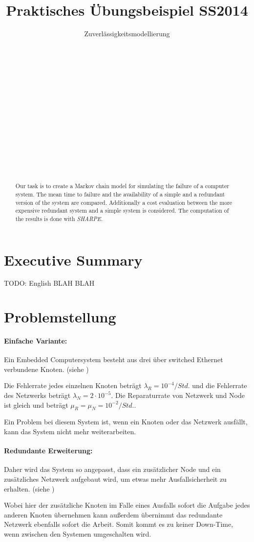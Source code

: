 \documentclass[
            a4paper
            ]{scrartcl}%
\title{Praktisches Übungsbeispiel SS2014}
\subtitle{Zuverlässigkeitsmodellierung}
\author{
 \authorname{Markus Kessler} \\
 \studentnumber{1225380} \\
 \curriculum{033 535}\\
 \email{e1225380@student.tuwien.ac.at}\\\\
 \authorname{Mathias Lechner} \\
 \studentnumber{1225134} \\
 \curriculum{033 535}\\
 \email{e1225134@student.tuwien.ac.at}\\\\
 \authorname{Martin Wührer} \\
 \studentnumber{1225177} \\
 \curriculum{033 535}\\
 \email{e1225177@student.tuwien.ac.at}
}
\begin{document}
\renewcommand*{\Frefeqname}{Gleichung}
\renewcommand*{\Freffigname}{Abbildung}
\renewcommand*{\Frefsecname}{Abschnitt}

\maketitle
\newpage

\tableofcontents
\newpage
\begin{abstract}
Our task is to create a Markov chain model for simulating the failure of a
computer system. The mean time to failure and the availability of a simple and a
redundant version of the system are compared. Additionally a cost evaluation
between the more expensive redundant system and a simple system is considered.
The computation of the results is done with \emph{SHARPE}.
\end{abstract}

\section{Executive Summary}
TODO: English BLAH BLAH
\newpage

\section{Problemstellung}
\paragraph{Einfache Variante:}
Ein Embedded Computersystem besteht aus drei über switched Ethernet verbundene
Knoten. (siehe )

Die Fehlerrate jedes einzelnen Knoten beträgt $\lambda_R=10^{-4}/Std.$ und die Fehlerrate
des Netzwerks beträgt $\lambda_N=2\cdot 10^{-5}$.
Die Reparaturrate von Netzwerk und Node ist gleich und beträgt
$\mu_R=\mu_N=10^{-2}/Std.$.

Ein Problem bei diesem System ist, wenn ein Knoten oder das Netzwerk ausfällt, kann das System nicht mehr
weiterarbeiten.

\paragraph{Redundante Erweiterung:}
Daher wird das System so angepasst, dass ein zusätzlicher Node und ein
zusätzliches Netzwerk aufgebaut wird, um etwas mehr Ausfallsicherheit zu
erhalten. (siehe )

Wobei hier der zusätzliche Knoten im Falle eines Ausfalls sofort die
Aufgabe jedes anderen Knoten übernehmen kann außerdem übernimmt das redundante
Netzwerk ebenfalls sofort die Arbeit. Somit kommt es zu keiner Down-Time, wenn
zwischen den Systemen umgeschalten wird.
\end{document}
